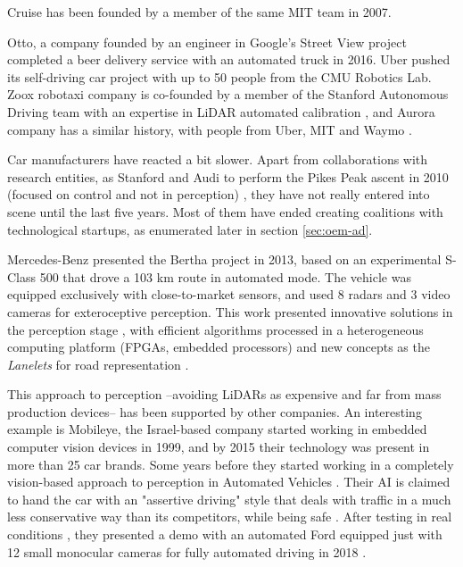 Cruise has been founded by a member of the same MIT team in 2007.

Otto, a company founded by an engineer in Google's 
Street View project completed a beer delivery service with an automated truck in 2016.
Uber pushed its self-driving car project with up to 50 people from the CMU 
Robotics Lab. Zoox robotaxi company is co-founded by a member of the Stanford 
Autonomous Driving team with an expertise in LiDAR automated calibration 
\cite{Levinson2011a}, and Aurora company has a similar history, with people from Uber, MIT and Waymo \cite{Anderson2013}.

Car manufacturers have reacted a bit slower. 
Apart from collaborations with research entities, as Stanford and Audi to perform the Pikes Peak ascent in 2010 (focused on control and not in perception) \cite{Funke2012}, they have not really entered into scene until the last five years. Most of them have ended creating coalitions with technological startups, as enumerated later in section \ref{sec:oem-ad}.

Mercedes-Benz presented the Bertha project in 2013, based on an experimental 
S-Class 500 that drove a 103 km route in automated mode. The vehicle was 
equipped exclusively with close-to-market sensors, and used 8 radars and 3 
video cameras for exteroceptive perception.
This work presented innovative solutions in the perception stage 
\cite{Bender2014}, with efficient algorithms processed in a heterogeneous 
computing platform (FPGAs, embedded processors) and new concepts as the 
\emph{Lanelets} for road representation \cite{Ziegler2014}. 

This approach to perception --avoiding LiDARs as expensive and far from mass 
production devices-- has been supported by other companies. An interesting 
example is Mobileye, the Israel-based company started working in embedded 
computer vision devices in 1999, and by 2015 their technology was present in 
more than 25 car brands. Some years before they started working in a completely 
vision-based approach to perception in Automated Vehicles \cite{Mobileye2018}. 
Their AI is claimed to hand the car with an "assertive driving" style that 
deals with traffic in a much less conservative way than its competitors, while 
being safe \cite{Shalev-shwartz2016, Shalev-Shwartz2017}. 
After testing in real conditions \cite{Edelstein2018}, they presented a demo with an automated Ford equipped just with 12 small monocular cameras for fully automated driving in 2018 \cite{Scheer2018}.

